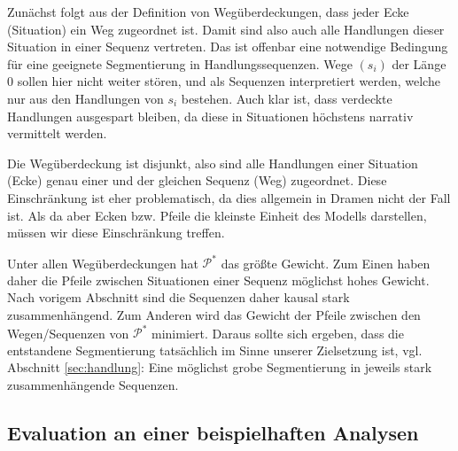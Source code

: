 \documentclass[a4paper,10pt,abstract=true,headings=small]{scrartcl}
\begin{document}
\begin{enumerate*}[itemjoin=\\\hspace*{\parindent}] %
    \item Zunächst folgt aus der Definition von Wegüberdeckungen, dass jeder Ecke (Situation) ein Weg zugeordnet ist.
        Damit sind also auch alle Handlungen dieser Situation in einer Sequenz vertreten.
        Das ist offenbar eine notwendige Bedingung für eine geeignete Segmentierung in Handlungssequenzen.
        Wege $(s_i)$ der Länge 0 sollen hier nicht weiter stören, und als Sequenzen interpretiert werden, welche nur aus den Handlungen von $s_i$ bestehen.
        Auch klar ist, dass verdeckte Handlungen ausgespart bleiben, da diese in Situationen höchstens narrativ vermittelt werden. 

    \item Die Wegüberdeckung ist disjunkt, also sind alle Handlungen einer Situation (Ecke) genau einer und der gleichen Sequenz (Weg) zugeordnet. 
        Diese Einschränkung ist eher problematisch, da dies allgemein in Dramen nicht der Fall ist.
        Als da aber Ecken bzw. Pfeile die kleinste Einheit des Modells darstellen, müssen wir diese Einschränkung treffen.

    \item Unter allen Wegüberdeckungen hat $\mathcal{P}^*$ das größte Gewicht.
        Zum Einen haben daher die Pfeile zwischen Situationen einer Sequenz möglichst hohes Gewicht.
        Nach vorigem Abschnitt sind die Sequenzen daher kausal stark zusammenhängend.
        Zum Anderen wird das Gewicht der Pfeile zwischen den Wegen/Sequenzen von $\mathcal{P}^*$ minimiert.
        Daraus sollte sich ergeben, dass die entstandene Segmentierung tatsächlich  im Sinne unserer Zielsetzung ist, vgl. Abschnitt \ref{sec:handlung}:
        Eine möglichst grobe Segmentierung in jeweils stark zusammenhängende Sequenzen.
\end{enumerate*}




\subsection{Evaluation an einer beispielhaften Analysen}
\end{document}
